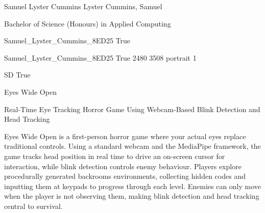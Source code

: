 \documentclass[twoside]{report}
\begin{document}
\begingroup{}\relax



\def\Key{Samuel_Lyster_Cummins_8ED25}

{Samuel Lyster Cummins}
{Lyster Cummins, Samuel}

{Bachelor of Science (Honours) in Applied Computing}

{Samuel_Lyster_Cummins_8ED25}
{True}

{Samuel_Lyster_Cummins_8ED25}
{True}
{2480}
{3508}
{portrait}
{1}

{SD}
{True}

{Eyes Wide Open}

{Real-Time Eye Tracking Horror Game Using Webcam-Based Blink Detection and Head Tracking}

{Eyes Wide Open is a first-person horror game where your actual eyes replace traditional controls. Using a standard webcam and the MediaPipe framework, the game tracks head position in real time to drive an on-screen cursor for interaction, while blink detection controls enemy behaviour. Players explore procedurally generated backrooms environments, collecting hidden codes and inputting them at keypads to progress through each level. Enemies can only move when the player is not observing them, making blink detection and head tracking central to survival.}
\end{document}
